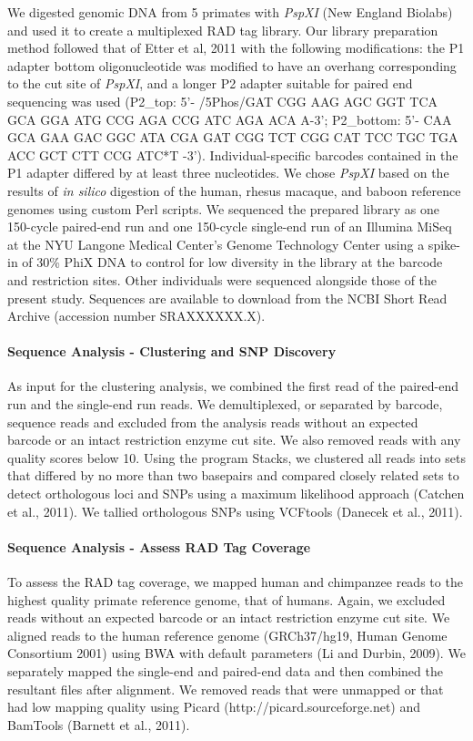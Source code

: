 \documentclass[12pt]{article}
\begin{document}
	We digested genomic DNA from 5 primates with \emph{PspXI} (New England Biolabs) and used it to create a multiplexed RAD tag library. Our library preparation method followed that of Etter et al, 2011 with the following modifications: the P1 adapter bottom oligonucleotide was modified to have an overhang corresponding to the cut site of \emph{PspXI}, and a longer P2 adapter suitable for paired end sequencing was used (P2\_top: 5'- /5Phos/GAT CGG AAG AGC GGT TCA GCA GGA ATG CCG AGA CCG ATC AGA ACA A-3'; P2\_bottom: 5'- CAA GCA GAA GAC GGC ATA CGA GAT CGG TCT CGG CAT TCC TGC TGA ACC GCT CTT CCG ATC*T -3'). Individual-specific barcodes contained in the P1 adapter differed by at least three nucleotides. We chose \emph{PspXI} based on the results of \emph{in silico} digestion of the human, rhesus macaque, and baboon reference genomes using custom Perl scripts. We sequenced the prepared library as one 150-cycle paired-end run and one 150-cycle single-end run of an Illumina MiSeq at the NYU Langone Medical Center's Genome Technology Center using a spike-in of 30\% PhiX DNA to control for low diversity in the library at the barcode and restriction sites. Other individuals were sequenced alongside those of the present study. Sequences are available to download from the NCBI Short Read Archive (accession number SRAXXXXXX.X).

\paragraph{Sequence Analysis - Clustering and SNP Discovery}

As input for the clustering analysis, we combined the first read of the paired-end run and the single-end run reads. We demultiplexed, or separated by barcode, sequence reads and excluded from the analysis reads without an expected barcode or an intact restriction enzyme cut site. We also removed reads with any quality scores below 10. Using the program Stacks, we clustered all reads into sets that differed by no more than two basepairs and compared closely related sets to detect orthologous loci and SNPs using a maximum likelihood approach (Catchen et al., 2011). We tallied orthologous SNPs using VCFtools (Danecek et al., 2011).

\paragraph{Sequence Analysis - Assess RAD Tag Coverage}

To assess the RAD tag coverage, we mapped human and chimpanzee reads to the highest quality primate reference genome, that of humans. Again, we excluded reads without an expected barcode or an intact restriction enzyme cut site. We aligned reads to the human reference genome (GRCh37/hg19, Human Genome Consortium 2001) using BWA with default parameters (Li and Durbin, 2009). We separately mapped the single-end and paired-end data and then combined the resultant files after alignment. We removed reads that were unmapped or that had low mapping quality using Picard (http://picard.sourceforge.net) and BamTools (Barnett et al., 2011). 
\end{document}
